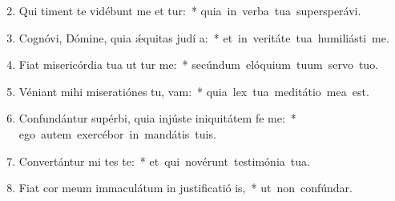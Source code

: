 \begin{flushleft}
\begin{enumerate}[leftmargin=*]
\setcounter{enumi}{1}

\item Qui timent te vidébunt me et tur:~* \mbox{quia in verba tua supersperávi.}
\item Cognóvi, Dómine, quia \'{\ae}quitas judí a:~* \mbox{et in veritáte tua humiliásti me.}
\item Fiat misericórdia tua ut tur me:~* \mbox{secúndum elóquium tuum servo tuo.}
\item Véniant mihi miseratiónes tu,  vam:~* \mbox{quia lex tua meditátio mea est.}
\item Confundántur supérbi, quia injúste iniquitátem fe  me:~* \mbox{ego autem exercébor in mandátis tuis.}
\item Convertántur mi tes te:~* \mbox{et qui novérunt testimónia tua.}
\item Fiat cor meum immaculátum in justificatió is,~* \mbox{ut non confúndar.}


\end{enumerate}
\end{flushleft}

